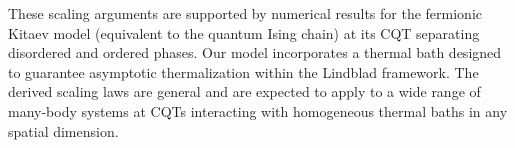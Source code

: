 {    These scaling arguments are supported by numerical results for the fermionic Kitaev model (equivalent to the quantum Ising chain) at its CQT separating disordered and ordered phases. Our model incorporates a thermal bath designed to guarantee asymptotic thermalization within the Lindblad framework. The derived scaling laws are general and are expected to apply to a wide range of many-body systems at CQTs interacting with homogeneous thermal baths in any spatial dimension.
}

